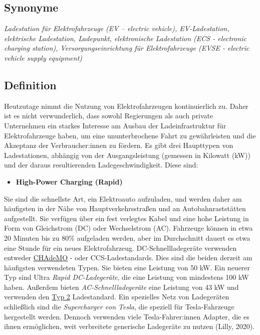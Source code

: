 \documentclass[
]{book}
\providecommand{\tightlist}{%
  \setlength{\itemsep}{0pt}\setlength{\parskip}{0pt}}
\begin{document}
\hypertarget{synonyme-7}{%
\subsection*{Synonyme}\label{synonyme-7}}

\emph{Ladestation für Elektrofahrzeuge (EV -- electric vehicle), EV-Ladestation, elektrische Ladestation, Ladepunkt, elektronische Ladestation (ECS - electronic charging station), Versorgungseinrichtung für Elektrofahrzeuge (EVSE - electric vehicle supply equipment)}

\hypertarget{definition-8}{%
\subsection*{Definition}\label{definition-8}}

Heutzutage nimmt die Nutzung von Elektrofahrzeugen kontinuierlich zu. Daher ist es nicht verwunderlich, dass sowohl Regierungen als auch private Unternehmen ein starkes Interesse am Ausbau der Ladeinfrastruktur für Elektrofahrzeuge haben, um eine ununterbrochene Fahrt zu gewährleisten und die Akzeptanz der Verbraucher:innen zu fördern. Es gibt drei Haupttypen von Ladestationen, abhängig von der Ausgangsleistung (gemessen in Kilowatt (kW)) und der daraus resultierenden Ladegeschwindigkeit. Diese sind:

\begin{itemize}
\tightlist
\item
  \textbf{High-Power Charging (Rapid)}
\end{itemize}

Sie sind die schnellste Art, ein Elektroauto aufzuladen, und werden daher am häufigsten in der Nähe von Hauptverkehrsstraßen und an Autobahnraststätten aufgestellt. Sie verfügen über ein fest verlegtes Kabel und eine hohe Leistung in Form von Gleichstrom (DC) oder Wechselstrom (AC). Fahrzeuge können in etwa 20 Minuten bis zu 80\% aufgeladen werden, aber im Durchschnitt dauert es etwa eine Stunde für ein neues Elektrofahrzeug. DC-Schnellladegeräte verwenden entweder \href{https://chademo.com/}{CHAdeMO} - oder CCS-Ladestandards. Dies sind die beiden derzeit am häufigsten verwendeten Typen. Sie bieten eine Leistung von 50 kW. Ein neuerer Typ sind Ultra \emph{Rapid DC-Ladegeräte}, die eine Leistung von mindestens 100 kW haben. Außerdem bieten \emph{AC-Schnellladegeräte} eine Leistung von 43 kW und verwenden den \href{https://www.mobilityhouse.com/int_en/knowledge-center/charging-cable-and-plug-types\#:~:text=Type\%202\%20plug,-The\%20triple\%2Dphase\&text=In\%20private\%20spaces\%2C\%20charging\%20power,with\%20a\%20type\%202\%20socket.}{Typ 2} Ladestandard. Ein spezielles Netz von Ladegeräten schließlich sind die \emph{Supercharger von Tesla}, die speziell für Tesla-Fahrzeuge hergestellt werden. Dennoch verwenden viele Tesla-Fahrer:innen Adapter, die es ihnen ermöglichen, weit verbreitete generische Ladegeräte zu nutzen (Lilly, 2020).
\end{document}
